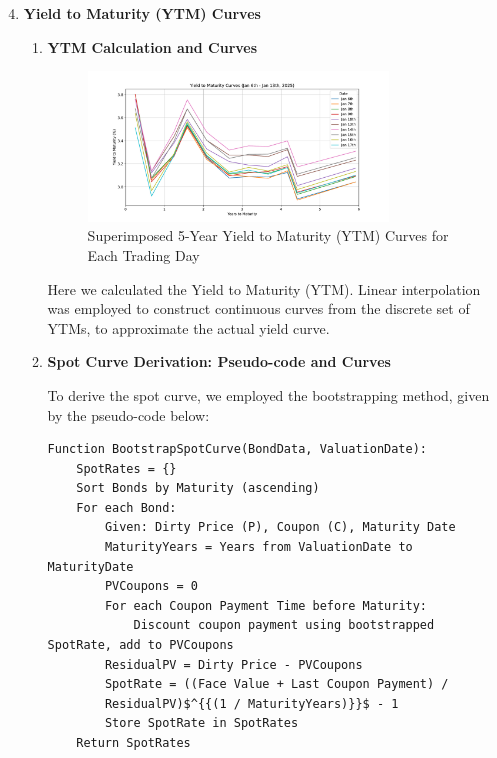 \documentclass{article}
\begin{document}
\begin{enumerate}
\setcounter{enumi}{3}

    \item \textbf{Yield to Maturity (YTM) Curves}
    \begin{enumerate}
        \item \textbf{YTM Calculation and Curves}
        
        \begin{figure}[h!]
                \centering
                \includegraphics[width=0.8\textwidth]{ytm_curves.pdf} %
                \caption{Superimposed 5-Year Yield to Maturity (YTM) Curves for Each Trading Day}
                \label{fig:ytm_curves}
            \end{figure}

            Here we calculated the Yield to Maturity (YTM). Linear interpolation was employed to construct continuous curves from the discrete set of YTMs, to approximate the actual yield curve.

        \item \textbf{Spot Curve Derivation: Pseudo-code and Curves}

            To derive the spot curve, we employed the bootstrapping method, given by the pseudo-code below:

\begin{verbatim}
Function BootstrapSpotCurve(BondData, ValuationDate):
    SpotRates = {}
    Sort Bonds by Maturity (ascending)
    For each Bond:
        Given: Dirty Price (P), Coupon (C), Maturity Date
        MaturityYears = Years from ValuationDate to MaturityDate
        PVCoupons = 0
		For each Coupon Payment Time before Maturity:
            Discount coupon payment using bootstrapped SpotRate, add to PVCoupons
        ResidualPV = Dirty Price - PVCoupons
        SpotRate = ((Face Value + Last Coupon Payment) / 
        ResidualPV)$^{{(1 / MaturityYears)}}$ - 1
		Store SpotRate in SpotRates
	Return SpotRates
\end{verbatim}


\end{enumerate}
\end{enumerate}
\end{document}
